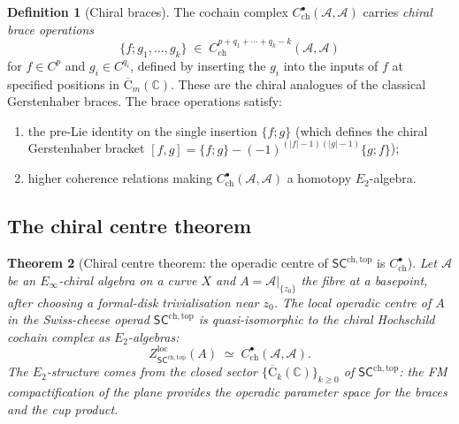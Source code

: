 \documentclass[11pt,reqno]{amsart}
\newtheorem{theorem}{Theorem}[section]
\theoremstyle{definition}
\newtheorem{definition}[theorem]{Definition}
\theoremstyle{remark}
\providecommand{\cA}{\mathcal{A}}
\providecommand{\FM}{\overline{\mathrm{C}}}
\providecommand{\Etwo}{E_2}
\providecommand{\Einf}{E_\infty}
\providecommand{\SCchtop}{\ensuremath{\mathsf{SC}^{\mathrm{ch,top}}}}
\providecommand{\bC}{\mathbb{C}}
\begin{document}
\begin{definition}[Chiral braces]
\label{def:e-chiral-braces}
The cochain complex $C^\bullet_{\mathrm{ch}}(\cA, \cA)$
carries \emph{chiral brace operations}
\begin{equation}\label{eq:e-braces}
\{f; g_1, \ldots, g_k\}
\;\in\;
C^{p+q_1+\cdots+q_k - k}_{\mathrm{ch}}(\cA, \cA)
\end{equation}
for $f \in C^p$ and $g_i \in C^{q_i}$, defined by inserting
the $g_i$ into the inputs of $f$ at specified positions in
$\FM_m(\bC)$. These are the chiral analogues of the classical
Gerstenhaber braces. The brace operations satisfy:
\begin{enumerate}[label=\textup{(\roman*)}]
\item the pre-Lie identity on the single insertion
 $\{f; g\}$ (which defines the chiral Gerstenhaber bracket
 $[f, g] = \{f; g\} - (-1)^{(|f|-1)(|g|-1)}\{g; f\}$);
\item higher coherence relations making
 $C^\bullet_{\mathrm{ch}}(\cA, \cA)$ a homotopy
 $\Etwo$-algebra.
\end{enumerate}
\end{definition}

\subsection{The chiral centre theorem}

\begin{theorem}[Chiral centre theorem: the operadic centre of
$\SCchtop$ is $C^\bullet_{\mathrm{ch}}$]
\label{thm:e-center-hochschild}
Let $\cA$ be an $\Einf$-chiral algebra on a curve $X$ and
$A = \cA|_{\{z_0\}}$ the fibre at a basepoint, after choosing a
formal-disk trivialisation near \(z_0\). The local
\emph{operadic centre} of \(A\) in the Swiss-cheese operad
$\SCchtop$ is quasi-isomorphic to the chiral Hochschild cochain
complex as $\Etwo$-algebras:
\begin{equation}\label{eq:e-center-qi}
Z_{\SCchtop}^{\mathrm{loc}}(A)
\;\simeq\;
C^\bullet_{\mathrm{ch}}(\cA, \cA).
\end{equation}
The $\Etwo$-structure comes from the closed sector
$\{\FM_k(\bC)\}_{k \ge 0}$ of $\SCchtop$: the FM
compactification of the plane provides the operadic parameter
space for the braces and the cup product.
\end{theorem}
\end{document}

